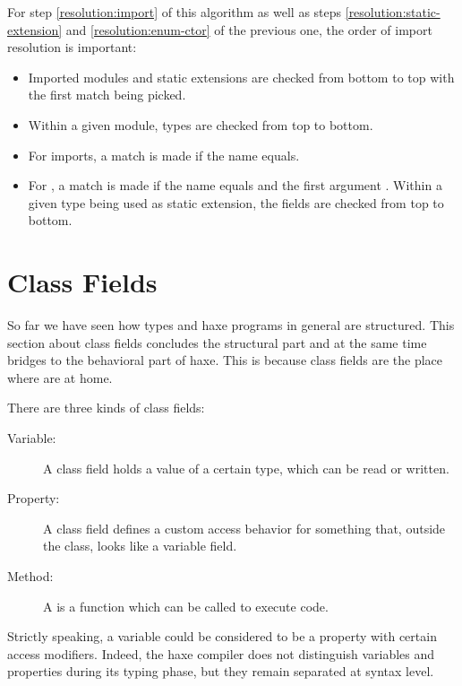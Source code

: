 \documentclass{haxe}
\begin{document}
For step \ref{resolution:import} of this algorithm as well as steps \ref{resolution:static-extension} and \ref{resolution:enum-ctor} of the previous one, the order of import resolution is important:

\begin{itemize}
	\item Imported modules and static extensions are checked from bottom to top with the first match being picked.
	\item Within a given module, types are checked from top to bottom.
	\item For imports, a match is made if the name equals.
	\item For , a match is made if the name equals and the first argument . Within a given type being used as static extension, the fields are checked from top to bottom.
\end{itemize}




\chapter{Class Fields}
\label{class-field}


So far we have seen how types and haxe programs in general are structured. This section about class fields concludes the structural part and at the same time bridges to the behavioral part of haxe. This is because class fields are the place where  are at home.

There are three kinds of class fields:

\begin{description}
	\item[Variable:] A  class field holds a value of a certain type, which can be read or written.
	\item[Property:] A  class field defines a custom access behavior for something that, outside the class, looks like a variable field.
	\item[Method:] A  is a function which can be called to execute code.
\end{description}
Strictly speaking, a variable could be considered to be a property with certain access modifiers. Indeed, the haxe compiler does not distinguish variables and properties during its typing phase, but they remain separated at syntax level.
\end{document}
